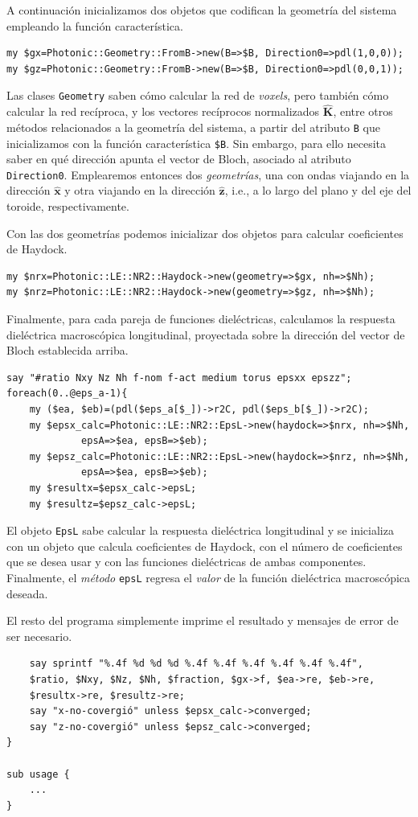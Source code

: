 \documentclass[12pt]{article}
\begin{document}
A continuación inicializamos dos objetos que codifican la geometría del
sistema empleando la función característica.
\begin{verbatim}
my $gx=Photonic::Geometry::FromB->new(B=>$B, Direction0=>pdl(1,0,0));
my $gz=Photonic::Geometry::FromB->new(B=>$B, Direction0=>pdl(0,0,1));
\end{verbatim}
Las clases {\tt Geometry} saben cómo calcular la red de {\em
  voxels}, pero también cómo calcular la red recíproca, y los
vectores recíprocos normalizados $\hat{\bm K}$, entre
otros métodos relacionados a la geometría del sistema, a partir del
atributo {\tt B} que inicializamos con la
función característica {\tt \$B}. Sin embargo, para ello necesita saber en qué
dirección apunta el vector de Bloch, asociado al atributo {\tt
  Direction0}. Emplearemos entonces dos {\em geometrías},
una con ondas viajando en la dirección $\hat{\bm x}$ y otra viajando en
la dirección $\hat{\bm z}$, i.e., a lo largo del plano y del eje del
toroide, respectivamente.

Con las dos geometrías podemos inicializar dos objetos para calcular
coeficientes de Haydock.
\begin{verbatim}
my $nrx=Photonic::LE::NR2::Haydock->new(geometry=>$gx, nh=>$Nh);
my $nrz=Photonic::LE::NR2::Haydock->new(geometry=>$gz, nh=>$Nh);
\end{verbatim}
Finalmente, para cada pareja de funciones dieléctricas, calculamos la
respuesta dieléctrica macroscópica longitudinal, proyectada sobre la
dirección del vector de Bloch establecida arriba.
\begin{verbatim}
say "#ratio Nxy Nz Nh f-nom f-act medium torus epsxx epszz";
foreach(0..@eps_a-1){
    my ($ea, $eb)=(pdl($eps_a[$_])->r2C, pdl($eps_b[$_])->r2C);
    my $epsx_calc=Photonic::LE::NR2::EpsL->new(haydock=>$nrx, nh=>$Nh,
             epsA=>$ea, epsB=>$eb);
    my $epsz_calc=Photonic::LE::NR2::EpsL->new(haydock=>$nrz, nh=>$Nh,
             epsA=>$ea, epsB=>$eb);
    my $resultx=$epsx_calc->epsL;
    my $resultz=$epsz_calc->epsL;
\end{verbatim}
El objeto {\tt EpsL} sabe calcular la respuesta dieléctrica
longitudinal y se inicializa con un objeto que calcula
coeficientes de Haydock, con el número de coeficientes que se desea
usar y con las funciones dieléctricas de ambas
componentes. Finalmente, el {\em método} {\tt epsL} regresa el {\em
  valor} de la función dieléctrica macroscópica deseada.

El resto del programa simplemente imprime el resultado y mensajes de
error de ser necesario.
\begin{verbatim}
    say sprintf "%.4f %d %d %d %.4f %.4f %.4f %.4f %.4f %.4f",
    $ratio, $Nxy, $Nz, $Nh, $fraction, $gx->f, $ea->re, $eb->re,
    $resultx->re, $resultz->re;
    say "x-no-covergió" unless $epsx_calc->converged;
    say "z-no-covergió" unless $epsz_calc->converged;
}

sub usage {
    ...
}
\end{verbatim}
\end{document}
